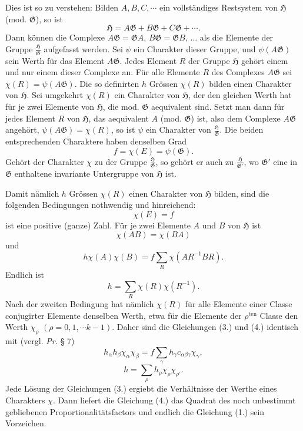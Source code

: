 \documentclass[11pt]{article}
\newcommand{\Hgrp}{\mathfrak{H}}
\newcommand{\Ggrp}{\mathfrak{G}}
\newcommand{\ten}{\mathrm{ten}}
\begin{document}
Dies ist so zu verstehen: Bilden $A,B,C,\cdots$ ein vollständiges Restsystem von $\Hgrp$ (mod. $\Ggrp$), so ist
\[
\Hgrp=A\Ggrp+B\Ggrp+C\Ggrp+\cdots.
\]
Dann können die Complexe $A\Ggrp=\Ggrp A$, $B\Ggrp=\Ggrp B$, $\ldots$ als die Elemente der Gruppe $\frac{\Hgrp}{\Ggrp}$ aufgefasst werden. Sei $\psi$ ein Charakter dieser Gruppe, und $\psi(A\Ggrp)$ sein Werth für das Element $A\Ggrp$. Jedes Element $R$ der Gruppe $\Hgrp$ gehört einem und nur einem dieser Complexe an. Für alle Elemente $R$ des Complexes $A\Ggrp$ sei $\chi(R)=\psi(A\Ggrp)$. Die so definirten $h$ Grössen $\chi(R)$ bilden einen Charakter von $\Hgrp$. Sei umgekehrt $\chi(R)$ ein Charakter von $\Hgrp$, der den gleichen Werth hat für je zwei Elemente von $\Hgrp$, die mod. $\Ggrp$ aequivalent sind. Setzt man dann für jedes Element $R$ von $\Hgrp$, das aequivalent $A$ (mod. $\Ggrp$) ist, also dem Complexe $A\Ggrp$ angehört, $\psi(A\Ggrp)=\chi(R)$, so ist $\psi$ ein Charakter von $\frac{\Hgrp}{\Ggrp}$. Die beiden entsprechenden Charaktere haben denselben Grad
\[
f=\chi(E)=\psi(\Ggrp).
\]
Gehört der Charakter $\chi$ zu der Gruppe $\frac{\Hgrp}{\Ggrp}$, so gehört er auch zu $\frac{\Hgrp}{\Ggrp'}$, wo $\Ggrp'$ eine in $\Ggrp$ enthaltene invariante Untergruppe von $\Hgrp$ ist.

Damit nämlich $h$ Grössen $\chi(R)$ einen Charakter von $\Hgrp$ bilden, sind die folgenden Bedingungen nothwendig und hinreichend:
\begin{equation}\tag{1.}
\chi(E)=f
\end{equation}
ist eine positive (ganze) Zahl. Für je zwei Elemente $A$ und $B$ von $\Hgrp$ ist
\begin{equation}\tag{2.}
\chi(AB)=\chi(BA)
\end{equation}
und
\begin{equation}\tag{3.}
h\chi(A)\chi(B)=f\sum_R\chi(AR^{-1}BR).
\end{equation}
Endlich ist
\begin{equation}\tag{4.}
h=\sum_R\chi(R)\chi(R^{-1}).
\end{equation}
Nach der zweiten Bedingung hat nämlich $\chi(R)$ für alle Elemente einer Classe conjugirter Elemente denselben Werth, etwa für die Elemente der $\rho^{\ten}$ Classe den Werth $\chi_\rho$ $(\rho=0,1,\cdots k-1)$. Daher sind die Gleichungen (3.) und (4.) identisch mit (vergl. \emph{Pr.} § 7)
\begin{equation}\tag{3.}
h_\alpha h_\beta\chi_\alpha\chi_\beta=f\sum_\gamma h_\gamma c_{\alpha\beta\gamma}\chi_\gamma,
\end{equation}
\begin{equation}\tag{4.}
h=\sum_\rho h_\rho\chi_\rho\chi_{\rho'}.
\end{equation}
Jede Lösung der Gleichungen (3.) ergiebt die Verhältnisse der Werthe eines Charakters $\chi$. Dann liefert die Gleichung (4.) das Quadrat des noch unbestimmt gebliebenen Proportionalitätsfactors und endlich die Gleichung (1.) sein Vorzeichen.
\end{document}
